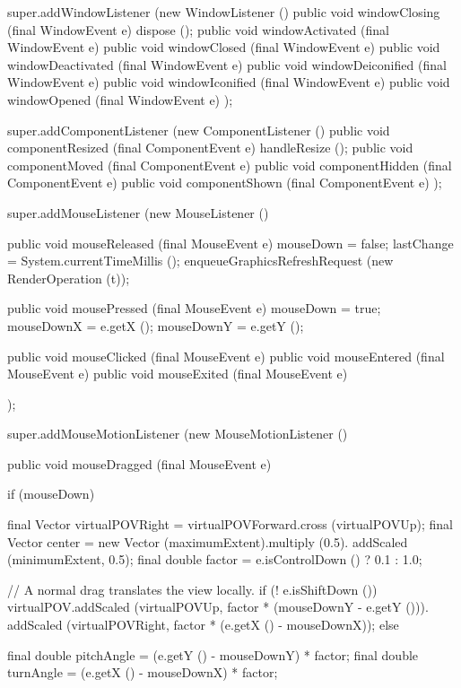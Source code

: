 \documentclass{report}
\begin{document}
\begin{javacode}
{{    super.addWindowListener (new WindowListener ()
      {public void windowClosing     (final WindowEvent e) {dispose ();}
       public void windowActivated   (final WindowEvent e) {}
       public void windowClosed      (final WindowEvent e) {}
       public void windowDeactivated (final WindowEvent e) {}
       public void windowDeiconified (final WindowEvent e) {}
       public void windowIconified   (final WindowEvent e) {}
       public void windowOpened      (final WindowEvent e) {}});

    super.addComponentListener (new ComponentListener ()
      {public void componentResized (final ComponentEvent e) {handleResize ();}
       public void componentMoved   (final ComponentEvent e) {}
       public void componentHidden  (final ComponentEvent e) {}
       public void componentShown   (final ComponentEvent e) {}});

    super.addMouseListener (new MouseListener () {public void mouseReleased (final MouseEvent e)
                                                    {mouseDown = false;
                                                     lastChange = System.currentTimeMillis ();
                                                     enqueueGraphicsRefreshRequest (new RenderOperation (t));}

                                                  public void mousePressed  (final MouseEvent e)
                                                    {mouseDown = true;
                                                     mouseDownX = e.getX ();
                                                     mouseDownY = e.getY ();}

                                                  public void mouseClicked  (final MouseEvent e) {}
                                                  public void mouseEntered  (final MouseEvent e) {}
                                                  public void mouseExited   (final MouseEvent e) {}});

    super.addMouseMotionListener (new MouseMotionListener () {
      public void mouseDragged (final MouseEvent e) {
        if (mouseDown) {
          final Vector virtualPOVRight = virtualPOVForward.cross (virtualPOVUp);
          final Vector center          = new Vector (maximumExtent).multiply (0.5).
                                                                    addScaled (minimumExtent, 0.5);
          final double factor          = e.isControlDown () ? 0.1 : 1.0;

          // A normal drag translates the view locally.
          if (! e.isShiftDown ())
            virtualPOV.addScaled (virtualPOVUp,    factor * (mouseDownY - e.getY ())).
                       addScaled (virtualPOVRight, factor * (e.getX () - mouseDownX));
          else {
            final double pitchAngle = (e.getY () - mouseDownY) * factor;
            final double turnAngle  = (e.getX () - mouseDownX) * factor;

}}}}}}
\end{javacode}
\end{document}
